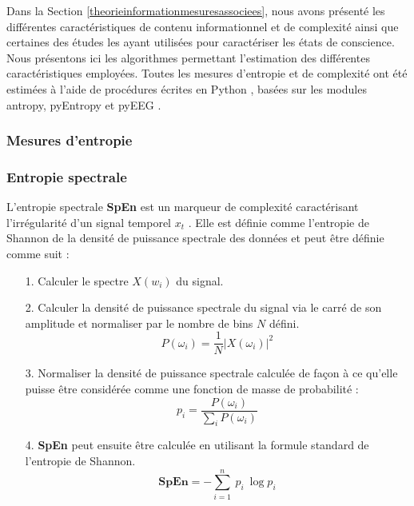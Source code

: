 Dans la Section \ref{theorieinformationmesuresassociees}, nous avons présenté les différentes caractéristiques de contenu informationnel et de complexité ainsi que certaines des études les ayant utilisées pour caractériser les états de conscience. 
Nous présentons ici les algorithmes permettant l'estimation des différentes caractéristiques employées. 
Toutes les mesures d'entropie et de complexité ont été estimées à l'aide de procédures écrites en Python \citep{van2007python}, basées sur les modules antropy, pyEntropy et pyEEG \citep{bao2011pyeeg}.

\subsubsection{Mesures d'entropie}

\subsubsection*{Entropie spectrale}

L'entropie spectrale \textbf{SpEn} est un marqueur de complexité caractérisant l'irrégularité d'un signal temporel $x_t$ \citep{inouye1991quantification}. 
Elle est définie comme l'entropie de Shannon de la densité de puissance spectrale des données et peut être définie comme suit : \\

\begin{itemize}
\item[1.] Calculer le spectre $X(w_i)$ du signal.
\item[2.] Calculer la densité de puissance spectrale du signal via le carré de son amplitude et normaliser par le nombre de bins $N$ défini.
\begin{equation} 
P(\omega_i) = \frac{1}{N} |X(\omega_i)|^2
\end{equation}
\item[3.] Normaliser la densité de puissance spectrale calculée de façon à ce qu'elle puisse être considérée comme une fonction de masse de probabilité :
\begin{equation}
p_i = \frac{P(\omega_i)}{\sum_i P(\omega_i)}
\end{equation}
\item[4.] \textbf{SpEn} peut ensuite être calculée en utilisant la formule standard de l'entropie de Shannon.
\begin{equation}
\textbf{SpEn} = - \sum_{i=1}^n~p_i~\log p_i
\end{equation}
\end{itemize}

